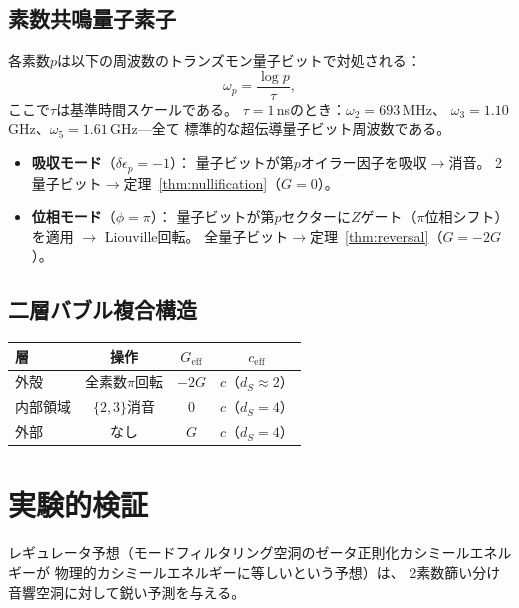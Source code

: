 \documentclass[a4paper,11pt]{article}
\begin{document}
\subsection{素数共鳴量子素子}

各素数$p$は以下の周波数のトランズモン量子ビットで対処される：
\begin{equation}
  \omega_p = \frac{\log p}{\tau},
\end{equation}
ここで$\tau$は基準時間スケールである。
$\tau = 1$\,nsのとき：$\omega_2 = 693$\,MHz、
$\omega_3 = 1.10$\,GHz、$\omega_5 = 1.61$\,GHz---全て
標準的な超伝導量子ビット周波数である。

\begin{itemize}
\item \textbf{吸収モード}（$\delta\epsilon_p = -1$）：
  量子ビットが第$p$オイラー因子を吸収$\to$消音。
  2量子ビット$\to$定理~\ref{thm:nullification}（$G = 0$）。
\item \textbf{位相モード}（$\phi = \pi$）：
  量子ビットが第$p$セクターに$Z$ゲート（$\pi$位相シフト）を適用
  $\to$ Liouville回転。
  全量子ビット$\to$定理~\ref{thm:reversal}（$G = -2G$）。
\end{itemize}

\subsection{二層バブル複合構造}

\begin{center}
\begin{tabular}{lccc}
\toprule
層 & 操作 & $G_{\mathrm{eff}}$ & $c_{\mathrm{eff}}$ \\
\midrule
外殻 & 全素数$\pi$回転 & $-2G$ & $c$（$d_S \approx 2$） \\
内部領域 & $\{2,3\}$消音 & $0$ & $c$（$d_S = 4$） \\
外部 & なし & $G$ & $c$（$d_S = 4$） \\
\bottomrule
\end{tabular}
\end{center}

\section{実験的検証}
\label{sec:experiment}

レギュレータ予想（モードフィルタリング空洞のゼータ正則化カシミールエネルギーが
物理的カシミールエネルギーに等しいという予想）は、
2素数篩い分け音響空洞に対して鋭い予測を与える。
\end{document}
